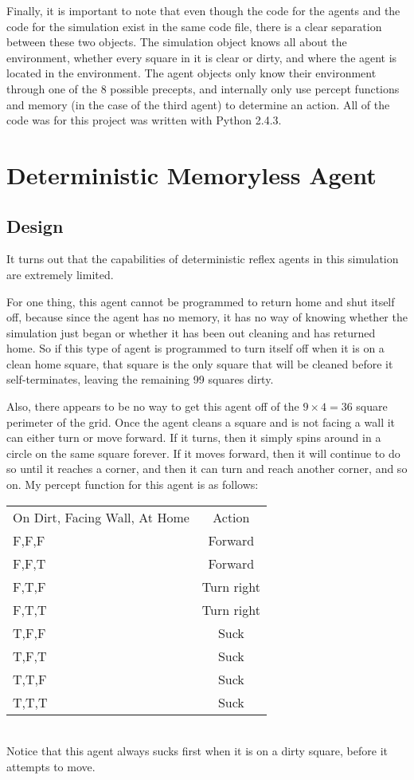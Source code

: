 \documentclass[10 pt.]{article}
\begin{document}
Finally, it is important to note that even though the code for the agents and the code for the
simulation exist in the same code file, there is a clear separation between these two objects.
The simulation object knows all about the environment, whether every square in it is clear or dirty, and 
where the agent is located in the environment. The agent objects only know their environment through one
of the 8 possible precepts, and internally only use percept functions and memory (in the case
of the third agent) to determine an action. All of the code was for this project was written with
Python 2.4.3.

\section{Deterministic Memoryless Agent}
\subsection{Design}
It turns out that the capabilities of deterministic reflex agents in this simulation are extremely
limited.

For one thing, this agent cannot be programmed to return home and shut itself off, because
since the agent has no memory, it has no way of knowing whether the simulation just began or whether
it has been out cleaning and has returned home. So if this type of agent is programmed to turn itself
off when it is on a clean home square, that square is the only square that will be cleaned before it
self-terminates, leaving the remaining 99 squares dirty.

Also, there appears to be no way to get this agent off of the $9 \times 4 = 36$ square perimeter of the
grid. Once the agent cleans a square and is not facing a wall it can either turn or move forward. If it
turns, then it simply spins around in a circle on the same square forever.
If it moves forward, then it will continue to do so until it reaches a corner, and then it can turn and reach
another corner, and so on. My percept function for this agent is as follows:\\

\begin{tabular}{ l c }
On Dirt, Facing Wall, At Home & Action \\
F,F,F & Forward \\
F,F,T & Forward \\
F,T,F & Turn right \\
F,T,T & Turn right \\
T,F,F & Suck \\
T,F,T & Suck \\
T,T,F & Suck \\
T,T,T & Suck \\
\end{tabular}\\
Notice that this agent always sucks first when it is on a dirty square, before it attempts to move.
\end{document}
